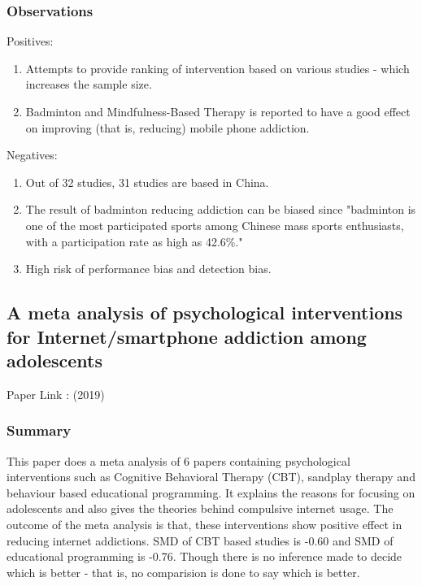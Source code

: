 \documentclass{article}
\begin{document}
\subsubsection{Observations}
Positives:
\begin{enumerate}
    \item Attempts to provide ranking of intervention based on various studies - which increases the sample size.
    \item Badminton and Mindfulness-Based Therapy is reported to have a good effect on improving (that is, reducing) mobile phone addiction.
\end{enumerate}
Negatives:
\begin{enumerate}
    \item Out of 32 studies, 31 studies are based in China.
    \item The result of badminton reducing addiction can be biased since "badminton is one of the most participated sports among Chinese
mass sports enthusiasts, with a participation rate as high as 42.6\%."
    \item High risk of performance bias and detection bias.
\end{enumerate}


\subsection{A meta analysis of psychological interventions for Internet/smartphone addiction among adolescents}
Paper Link : \cite{metaanalysis2019internetaddiction} (2019)
\subsubsection{Summary}
This paper does a meta analysis of 6 papers containing psychological interventions such as Cognitive Behavioral Therapy (CBT), sandplay therapy and behaviour based educational programming. 
It explains the reasons for focusing on adolescents and also gives the theories behind compulsive internet usage.
The outcome of the meta analysis is that, these interventions show positive effect in reducing internet addictions. SMD of CBT based studies is -0.60 and SMD of educational programming is -0.76. Though there is no inference made to decide which is better - that is, no comparision is done to say which is better.
\end{document}
